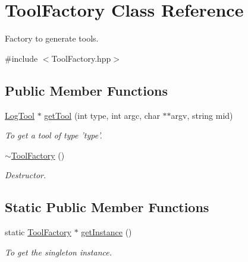 \hypertarget{classToolFactory}{
\section{ToolFactory Class Reference}
\label{classToolFactory}
}


Factory to generate tools.  




{\ttfamily \#include $<$ToolFactory.hpp$>$}

\subsection*{Public Member Functions}
\begin{DoxyCompactItemize}
\item 
\hyperlink{classLogTool}{LogTool} $\ast$ \hyperlink{classToolFactory_a1142003b41b2c25bd52c26c9044424ab}{getTool} (int type, int argc, char $\ast$$\ast$argv, string mid)
\begin{DoxyCompactList}\small\item\em To get a tool of type 'type'. \item\end{DoxyCompactList}\item 
\hypertarget{classToolFactory_a9ef12e4b45da9e15ccabf48a3d3909b9}{
\hyperlink{classToolFactory_a9ef12e4b45da9e15ccabf48a3d3909b9}{$\sim$ToolFactory} ()}
\label{classToolFactory_a9ef12e4b45da9e15ccabf48a3d3909b9}

\begin{DoxyCompactList}\small\item\em Destructor. \item\end{DoxyCompactList}\end{DoxyCompactItemize}
\subsection*{Static Public Member Functions}
\begin{DoxyCompactItemize}
\item 
static \hyperlink{classToolFactory}{ToolFactory} $\ast$ \hyperlink{classToolFactory_afdefb798d41d16f626cfe22fd7e1a9fe}{getInstance} ()
\begin{DoxyCompactList}\small\item\em To get the singleton instance. \item\end{DoxyCompactList}\end{DoxyCompactItemize}
